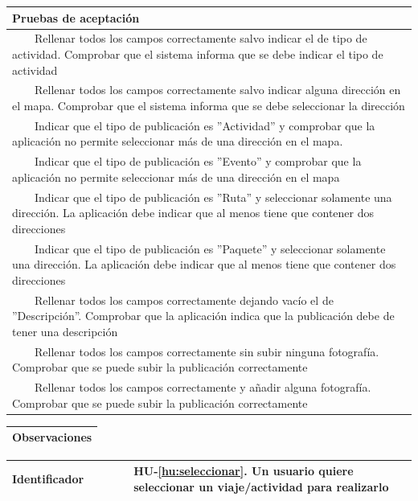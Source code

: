 \documentclass[11pt]{article}
\newcommand{\tabitem}{~~\llap{\textbullet}~~}
\begin{document}
  \begin{longtable}{p{1.028\linewidth}}
    \textbf{Pruebas de aceptación}\\
    \midrule
    \tabitem Rellenar todos los campos correctamente salvo indicar el de tipo de actividad. Comprobar que el sistema informa que se debe indicar el tipo de actividad\\
    \tabitem Rellenar todos los campos correctamente salvo indicar alguna dirección en el mapa. Comprobar que el sistema informa que se debe seleccionar la dirección\\
    \tabitem Indicar que el tipo de publicación es ''Actividad'' y comprobar que la aplicación no permite seleccionar  más de una dirección en el mapa.\\
    \tabitem Indicar que el tipo de publicación es ''Evento'' y comprobar que la aplicación no permite seleccionar  más de una dirección en el mapa\\
    \tabitem Indicar que el tipo de publicación es ''Ruta'' y seleccionar solamente una dirección. La aplicación debe indicar que al menos tiene que contener dos direcciones\\
    \tabitem Indicar que el tipo de publicación es ''Paquete'' y seleccionar solamente una dirección. La aplicación debe indicar que al menos tiene que contener dos direcciones\\
    \tabitem Rellenar todos los campos correctamente dejando vacío el de ''Descripción''. Comprobar que la aplicación indica que la publicación debe de tener una descripción\\
    \tabitem Rellenar todos los campos correctamente sin subir ninguna fotografía. Comprobar que se puede subir la publicación correctamente\\
    \tabitem Rellenar todos los campos correctamente y añadir alguna fotografía. Comprobar que se puede subir la publicación correctamente\\
\end{longtable}
\begin{longtable}{p{1.028\linewidth}}
  \textbf{Observaciones}\\
  \midrule
  \bottomrule
  \bottomrule
\end{longtable}



  \centering
  \begin{longtable}{p{0.3\linewidth}|p{0.7\linewidth}}
    \toprule
    \toprule
    \textbf{Identificador} & \textbf{HU-\ref{hu:seleccionar}}. Un usuario quiere seleccionar un viaje/actividad para realizarlo\\
    
    \bottomrule
  \end{longtable}
\end{document}

